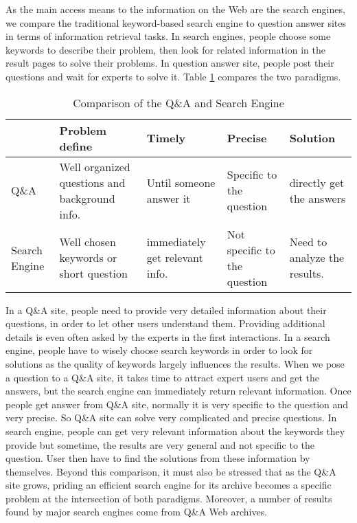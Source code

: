 As the main access means to the information on the Web are the search engines, we compare the traditional keyword-based search engine to question answer sites in terms of information retrieval tasks. In search engines, people choose some keywords to describe their problem, then look for related information in the result pages to solve their problems. In question answer site, people post their questions and wait for experts to solve it. Table \ref{tab:intro_compare} compares the two paradigms. 
\begin{table}[!hbp]
\tiny
\centering
\begin{tabular}{|p{58pt}|p{58pt}|p{58pt}|p{58pt}|p{58pt}|}
\hline
& Problem define & Timely & Precise & Solution \\
\hline
Q\&A & Well organized questions and background info. & Until someone answer it & Specific to the question& directly get the answers\\
\hline
Search Engine& Well chosen keywords or short question & immediately get relevant info. & Not specific to the question& Need to analyze the results.\\
\hline
\end{tabular}
\caption{Comparison of the Q\&A and Search Engine}
\label{tab:intro_compare}
\end{table}

In a Q\&A site, people need to provide very detailed information about their questions, in order to let other users understand them. Providing additional details is even often asked by the experts in the first interactions. In a search engine, people have to wisely choose search keywords in order to look for solutions as the quality of keywords largely influences the results. When we pose a question to a Q\&A site, it takes time to attract expert users and get the answers, but the search engine can immediately return relevant information. Once people get answer from Q\&A site, normally it is very specific to the question and very precise. So Q\&A site can solve very complicated and precise questions. In search engine, people can get very relevant information about the keywords they provide but sometime, the results are very general and not specific to the question. User then have to find the solutions from these information by themselves. Beyond this comparison, it must also be stressed that as the Q\&A site grows, priding an efficient search engine for its archive becomes a specific problem at the intersection of both paradigms. Moreover, a number of results found by major search engines come from Q\&A Web archives.

